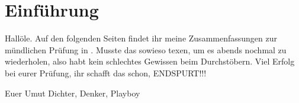 \chapter{Einführung}
Hallöle.
Auf den folgenden Seiten findet ihr meine Zusammenfassungen zur mündlichen Prüfung in \whichprep.
Musste das sowieso texen, um es abends nochmal zu wiederholen, also habt kein schlechtes Gewissen beim Durchstöbern.
Viel Erfolg bei eurer Prüfung, ihr schafft das schon, ENDSPURT!!!

Euer Umut
Dichter, Denker, Playboy
